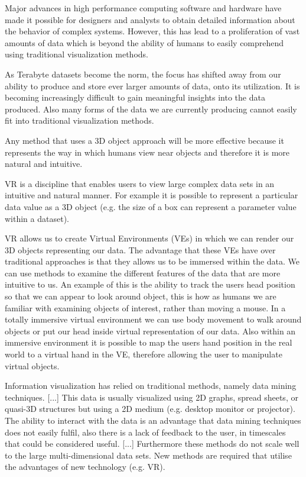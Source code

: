 Major advances in high performance computing software and hardware have made it possible for designers and analysts to obtain detailed information about the behavior of complex systems. However, this has lead to a proliferation of vast amounts of data which is beyond the ability of humans to easily comprehend using traditional visualization methods.
\cite{Sarathy2000}

As Terabyte datasets become the norm, the focus has shifted away from our ability to produce and store ever larger amounts of data, onto its utilization. It is becoming increasingly difficult to gain meaningful insights into the data produced. Also many forms of the data we are currently producing cannot easily fit into traditional visualization methods.
\cite{Jamieson2007}

Any method that uses a 3D object approach will be more effective because it represents the way in which humans view near objects and therefore it is more natural and intuitive.
\cite{Jamieson2007}

VR is a discipline that enables users to view large complex data sets in an intuitive and natural manner. For example it is possible to represent a particular data value as a 3D object (e.g. the size of a box can represent a parameter value within a dataset).
\cite{Jamieson2007}

VR allows us to create Virtual Environments (VEs) in which we can render our 3D objects representing our data. The advantage that these VEs have over traditional approaches is that they allows us to be immersed within the data. We can use methods to examine the different features of the data that are more intuitive to us. An example of this is the ability to track the users head position so that we can appear to look around object, this is how as humans we are familiar with examining objects of interest, rather than moving a mouse. In a totally immersive virtual environment we can use body movement to walk around objects or put our head inside virtual representation of our data. Also within an immersive environment it is possible to map the users hand position in the real world to a virtual hand in the VE, therefore allowing the user to manipulate virtual objects.
\cite{Jamieson2007}

Information visualization has relied on traditional methods, namely data mining techniques. [...] This data is usually visualized using 2D graphs, spread sheets, or quasi-3D structures but using a 2D medium (e.g. desktop monitor or projector). The ability to interact with the data is an advantage that data mining techniques does not easily fulfil, also there is a lack of feedback to the user, in timescales that could be considered useful. [...] Furthermore these methods do not scale well to the large multi-dimensional data sets. New methods are required that utilise the advantages of new technology (e.g. VR).
\cite{Jamieson2007}

